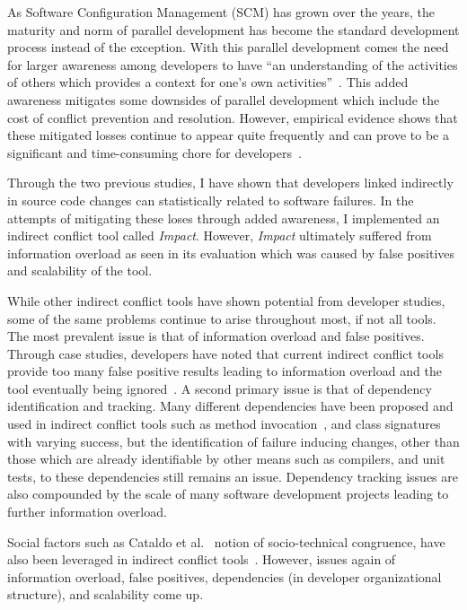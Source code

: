 \label{chapter:exploration}

As Software Configuration Management (SCM) has grown over the years, the maturity and norm of parallel 
development has become the standard development process instead of the exception. With this parallel development
comes the need for larger awareness among developers to have ``an understanding of the activities of others
which provides a context for one's own activities''~\cite{Dourish:1992:ACS}. This added awareness
mitigates some downsides of parallel development which include the cost of conflict prevention and resolution. However,
empirical evidence shows that these mitigated losses continue to appear quite frequently and can prove to be a significant
and time-consuming chore for developers~\cite{Perry:2001:PCL}.

Through the two previous studies, I have shown that developers linked indirectly in source code changes can statistically
related to software failures. In the attempts of mitigating these loses through added awareness, I implemented
an indirect conflict tool called \textit{Impact}. However, \textit{Impact} ultimately suffered from information
overload as seen in its evaluation which was caused by false positives and scalability of the tool.

While other indirect conflict tools have shown potential from developer studies, some of the same problems continue
to arise throughout most, if not all tools. The most prevalent issue is that of information
overload and false positives. Through case studies, developers have noted that current indirect conflict tools provide too many 
false positive results leading to information overload and the tool eventually being
ignored~\cite{Sarma:2007:TSA, Servant:2010:CPI}. A second primary issue is that of dependency identification and
tracking. Many different dependencies have been proposed and used in indirect conflict tools such as method 
invocation~\cite{Trainer:2005:BGT}, and class signatures~\cite{Sarma:2007:TSA} with varying success, but the 
identification of failure inducing changes, other than those which are already identifiable by other means such
as compilers, and unit tests, to these dependencies still remains an issue. Dependency tracking issues are
also compounded by the scale of many software development projects leading to further information overload.

Social factors such as Cataldo et al.~\cite{Cataldo:2006:ICR} notion of socio-technical
congruence, have also been leveraged in indirect conflict tools~\cite{Kwan:2011:ESC, Begel:2010:CDE, Borici:2012:CHA}.
However, issues again of information overload, false positives, dependencies (in developer organizational structure), and scalability 
come up.

